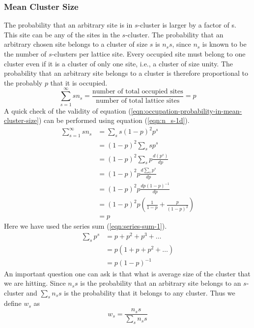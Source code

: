 		\subsubsection{Mean Cluster Size}
		The probability that an arbitrary site is in $s$-cluster is larger by a factor of s. This site can be any of the sites in the $s$-cluster. The probability that an arbitrary chosen site belongs to a cluster of size $s$ is $n_s s$, since $n_s$ is known to be the number of $s$-clusters per lattice site. Every occupied site must belong to one cluster even if it is a cluster of only one site, i.e., a cluster of size unity.  The probability that an arbitrary site belongs to a cluster is therefore proportional to the probably
		$p$ that it is occupied.
		\begin{equation}
			\sum_{s=1}^{\infty} s n_s = \frac{\text{number of total occupied sites}}{\text{number of total lattice sites}} = p
			\label{eqn:occupation-probability-in-mean-cluster-size}
		\end{equation}
		A quick check of the validity of equation (\ref{eqn:occupation-probability-in-mean-cluster-size}) can be performed using equation (\ref{eqn:n_s-1d}).
		\begin{align}
			\sum_{s=1}^{\infty}	s n_s \nonumber
			&=  \sum_{s} s (1-p)^2 p^s \nonumber \\
			&= (1-p)^2 \sum_{s} s p^s  \nonumber \\
			&= (1-p)^2 \sum_{s} p \frac{d(p^s)}{dp} \nonumber \\
			&= (1-p)^2 p \frac{d \sum_{s} p^s}{dp} \nonumber \\
			&= (1-p)^2 p \frac{d p(1-p)^{-1}}{dp} \nonumber \\
			&= (1-p)^2 p \left(\frac{1}{1-p} + \frac{p}{(1-p)^2}\right) \nonumber \\
			&= p 
		\end{align}
		Here we have used the series sum (\ref{eqn:series-sum-1}).
		\begin{align}
			\sum_s p^s 
			&= p + p^2 + p^3 + \ldots \nonumber \\
			&= p( 1 + p + p^2 + \ldots) \nonumber \\
			&= p(1-p)^{-1}
			\label{eqn:series-sum-1}
		\end{align}
		An important question one can ask is that what is average size of the cluster that we are hitting. Since $n_s s$ is the probability that an arbitrary site belongs to an $s$-cluster and $\sum_{s} n_s s$ is the probability that it belongs to any cluster. Thus we define $w_s$ as
		\begin{equation}
			w_s = \frac{n_s s}{\sum_{s} n_s s}
			\label{eqn:arbitrary-cluster-exactly-s-sites}
		\end{equation}
